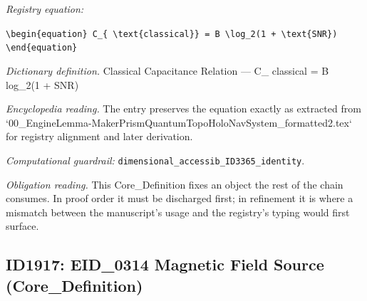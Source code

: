 \documentclass[11pt]{article}
\theoremstyle{remark}
\begin{document}
\noindent\textit{Registry equation:}\par
{\small\texttt{\textbackslash{}begin\{equation\} C\_\{ \textbackslash{}text\{classical\}\} = B \textbackslash{}log\_2(1 + \textbackslash{}text\{SNR\}) \textbackslash{}end\{equation\}}}\par\medskip
\noindent\textit{Dictionary definition.} Classical Capacitance Relation --- C\_ classical = B log\_2(1 + SNR)\par\medskip
\noindent\textit{Encyclopedia reading.} The entry preserves the equation exactly as extracted from `00\_EngineLemma-MakerPrismQuantumTopoHoloNavSystem\_formatted2.tex` for registry alignment and later derivation.
\par\medskip\noindent\textit{Computational guardrail:} \texttt{dimensional\_accessib\_ID3365\_identity}.
\par\medskip\noindent\textit{Obligation reading.} This Core\_Definition fixes an object the rest of the chain consumes. In proof order it must be discharged first; in refinement it is where a mismatch between the manuscript's usage and the registry's typing would first surface.

\subsection{ID1917: EID\_0314 Magnetic Field Source (Core\_Definition)}
\end{document}
